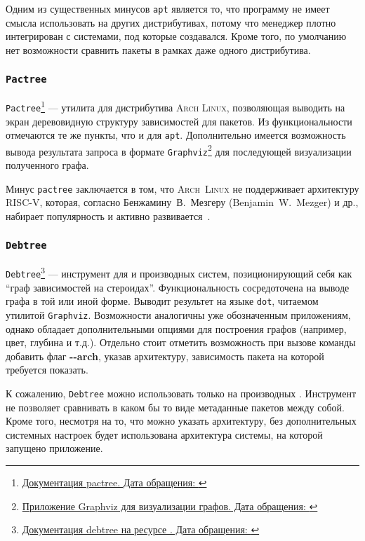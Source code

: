 Одним из существенных минусов \texttt{apt} является то, что программу не имеет смысла использовать на других дистрибутивах, потому что менеджер плотно интегрирован с системами, под которые создавался.
Кроме того, по умолчанию нет возможности сравнить пакеты в рамках даже одного дистрибутива.

\subsubsection{\texttt{Pactree}}
\texttt{Pactree}\footnote{\href{https://man.archlinux.org/man/extra/pacman-contrib/pactree.8.en}{Документация pactree. Дата обращения: }} --- утилита для дистрибутива \textsc{Arch Linux}, позволяющая выводить на экран деревовидную структуру зависимостей для пакетов.
Из функциональности отмечаются те же пункты, что и для \texttt{apt}. Дополнительно имеется возможность вывода результата запроса в формате \texttt{Graphviz}\footnote{\href{https://graphviz.org/}{Приложение Graphviz для визуализации графов. Дата обращения: }} для последующей визуализации полученного графа.

Минус \texttt{pactree} заключается в том, что \textsc{Arch~Linux} не поддерживает архитектуру \textsc{RISC-V}, которая, соглас\-но Бенжамину~В.~Мезгеру (Benjamin~W.~Mezger) и др., набирает популярность и активно развива\-ется~\cite{RISCVSurvey}.

\subsubsection{\texttt{Debtree}}
\texttt{Debtree}\footnote{\href{https://manpages.ubuntu.com/manpages/xenial/man1/debtree.1.html}{Документация debtree на ресурсе {\ubuntu}. Дата обращения: }} --- инструмент для {\debian} и производных систем, позиционирующий себя как ``граф зависимостей на стероидах''. Функциональность сосредоточена на выводе графа в той или иной форме.
Выводит результет на языке \texttt{dot}, читаемом утилитой \texttt{Graphviz}. Возможности аналогичны уже обозначенным приложениям, однако обладает дополнительными опциями для построения графов (например, цвет, глубина и т.д.).
Отдельно стоит отметить возможность при вызове команды добавить флаг \textbf{{-}{-}arch}, указав архитектуру, зависимость пакета на которой требуется показать.

К сожалению, \texttt{Debtree} можно использовать только на производных {\debian}. Инструмент не позволяет сравнивать в каком бы то виде метаданные пакетов между собой.
Кроме того, несмотря на то, что можно указать архитектуру, без дополнительных системных настроек будет использована архитектура системы, на которой запущено приложение.

